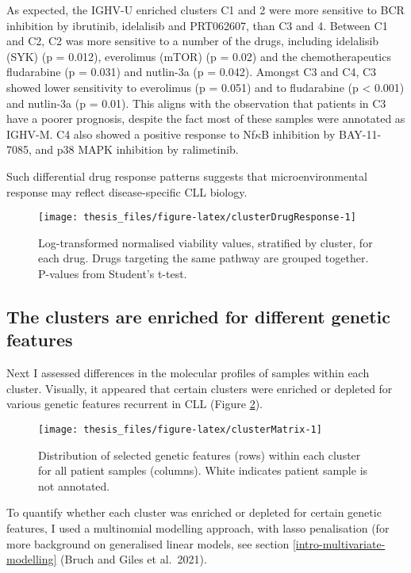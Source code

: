 \documentclass[11pt, a4paper, twosided]{book}
\begin{document}
As expected, the IGHV-U enriched clusters C1 and 2 were more sensitive to BCR inhibition by ibrutinib, idelalisib and PRT062607, than C3 and 4. Between C1 and C2, C2 was more sensitive to a number of the drugs, including idelalisib (SYK) (p = 0.012), everolimus (mTOR) (p = 0.02) and the chemotherapeutics fludarabine (p = 0.031) and nutlin-3a (p = 0.042). Amongst C3 and C4, C3 showed lower sensitivity to everolimus (p = 0.051) and to fludarabine (p \textless{} 0.001) and nutlin-3a (p = 0.01). This aligns with the observation that patients in C3 have a poorer prognosis, despite the fact most of these samples were annotated as IGHV-M. C4 also showed a positive response to Nf\(\kappa\)B inhibition by BAY-11-7085, and p38 MAPK inhibition by ralimetinib.

Such differential drug response patterns suggests that microenvironmental response may reflect disease-specific CLL biology.


\begin{figure}

{\centering \texttt{[image: thesis\_files/figure-latex/clusterDrugResponse-1]} 

}

\caption{Log-transformed normalised viability values, stratified by cluster, for each drug. Drugs targeting the same pathway are grouped together. P-values from Student's t-test.}\label{fig:clusterDrugResponse}
\end{figure}
\hypertarget{cluster-genetics}{%
\subsection{The clusters are enriched for different genetic features}\label{cluster-genetics}}

Next I assessed differences in the molecular profiles of samples within each cluster. Visually, it appeared that certain clusters were enriched or depleted for various genetic features recurrent in CLL (Figure \ref{fig:clusterMatrix}).


\begin{figure}

{\centering \texttt{[image: thesis\_files/figure-latex/clusterMatrix-1]} 

}

\caption{Distribution of selected genetic features (rows) within each cluster for all patient samples (columns). White indicates patient sample is not annotated.}\label{fig:clusterMatrix}
\end{figure}
To quantify whether each cluster was enriched or depleted for certain genetic features, I used a multinomial modelling approach, with lasso penalisation (for more background on generalised linear models, see section \ref{intro-multivariate-modelling} (Bruch and Giles et al.~2021).
\end{document}
